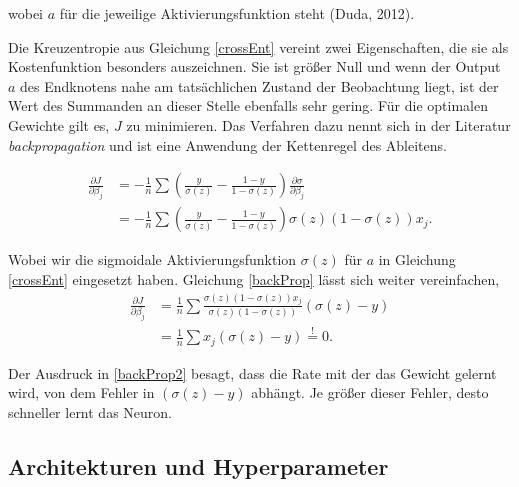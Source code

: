 \documentclass{article}
\begin{document}
wobei $a$ f{\"u}r die jeweilige Aktivierungsfunktion steht (Duda, 2012).

Die Kreuzentropie aus Gleichung \ref{crossEnt} vereint zwei Eigenschaften, die sie als Kostenfunktion besonders auszeichnen. Sie ist gr{\"o}{\ss}er Null und wenn der Output $a$ des Endknotens nahe am tats{\"a}chlichen Zustand der Beobachtung liegt, ist der Wert des Summanden an dieser Stelle ebenfalls sehr gering. F{\"u}r die optimalen Gewichte gilt es, $J$ zu minimieren. Das Verfahren dazu nennt sich in der Literatur \textit{backpropagation} und ist eine Anwendung der Kettenregel des Ableitens.

\begin{equation}
\label{backProp}
\begin{split}
\frac{\partial J}{\partial \beta_j} &= - \frac{1}{n}\sum \left( \frac{y}{\sigma (z)} - \frac{1-y}{1-\sigma(z)}
                                      \right) \frac{\partial \sigma}{\partial \beta_j} \\
                                    &= - \frac{1}{n}\sum \left( \frac{y}{\sigma (z)} - \frac{1-y}{1-\sigma(z)}
                                      \right) \sigma(z) \left( 1- \sigma(z) \right) x_j .
\end{split}
\end{equation}

Wobei wir die sigmoidale Aktivierungsfunktion $\sigma(z)$ f{\"u}r $a$ in Gleichung \ref{crossEnt} eingesetzt haben. Gleichung \ref{backProp} l{\"a}sst sich weiter vereinfachen,
\begin{equation}
\label{backProp2}
\begin{split}
\frac{\partial J}{\partial \beta_j} &= \frac{1}{n} \sum \frac{\sigma(z) \left( 1- \sigma(z)\right) x_j}{\sigma(z) \left( 1- \sigma(z) \right)} \left( \sigma(z) - y \right) \\
                                    &= \frac{1}{n} \sum x_j \left( \sigma(z) - y \right) \stackrel{!}{=} 0 .
\end{split}
\end{equation}

Der Ausdruck in \ref{backProp2} besagt, dass die Rate mit der das Gewicht gelernt wird, von dem Fehler in $\left( \sigma(z) - y \right)$ abh{\"a}ngt. Je gr{\"o}{\ss}er dieser Fehler, desto schneller lernt das Neuron.



\subsection{Architekturen und Hyperparameter}
\end{document}
